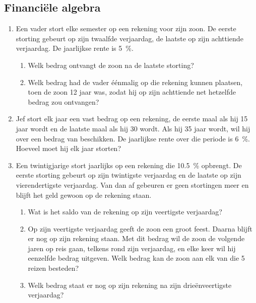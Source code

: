 \subsection{Financi\"{e}le algebra}

\begin{enumerate}
    \item   Een vader stort elke semester  op een rekening
    voor zijn zoon. De eerste storting gebeurt op zijn twaalfde verjaardag,
    de laatste op zijn achttiende verjaardag. De jaarlijkse rente is \SI{5}{\percent}.
    \begin{enumerate}
	\item Welk bedrag ontvangt de zoon na de laatste storting?

	\item Welk bedrag had de vader \'{e}\'{e}nmalig op die rekening
    kunnen plaatsen, toen de zoon 12 jaar was, zodat hij op zijn
    achttiende net hetzelfde bedrag zou ontvangen?
    \end{enumerate}

    \item Jef stort elk jaar een vast bedrag op een
    rekening, de eerste maal als hij 15 jaar wordt en de laatste maal
    als hij 30 wordt. Als hij 35 jaar wordt, wil hij over een bedrag
    van  beschikken. De jaarlijkse rente over die periode is \SI{6}{\percent}.
    Hoeveel moet hij elk jaar storten?



    \item  Een twintigjarige stort jaarlijks  op een rekening die
   \SI{10,5}{\percent}  opbrengt. De eerste storting gebeurt op zijn
   twintigste verjaardag en de laatste op zijn
   vierendertigste verjaardag. Van dan af gebeuren er geen
   stortingen meer en blijft het geld gewoon op de rekening staan.
   \begin{enumerate}
       \item  Wat is het saldo van de rekening op zijn
   veertigste verjaardag? 

        \item  Op zijn veertigste verjaardag geeft de
        zoon een groot feest. Daarna blijft er nog  op zijn
        rekening staan. Met dit bedrag wil de zoon de volgende jaren
        op reis gaan, telkens rond zijn verjaardag, en elke keer wil
        hij eenzelfde bedrag uitgeven. Welk bedrag kan de zoon
        aan elk van die 5 reizen besteden?
        \item  Welk bedrag staat er nog op zijn rekening na
    zijn drie\"{e}nveertigste verjaardag? 
    \end{enumerate} 
    

\end{enumerate}
